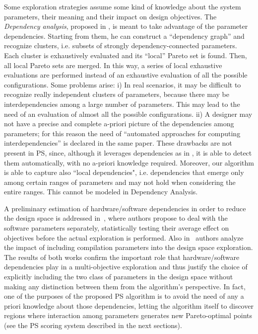 Some exploration strategies assume some kind of knowledge about the
system parameters, their meaning and their impact on design
objectives.  The \emph{Dependency analysis}, proposed in
\cite{givargis_tvlsi02}, is meant to take advantage of the parameter
dependencies. Starting from them, he can construct a ``dependency graph''
and recognize clusters, i.e. subsets of strongly dependency-connected
parameters. Each cluster is exhaustively evaluated and its ``local''
Pareto set is found. Then, all local Pareto sets are merged. In this
way, a series of local exhaustive evaluations are performed instead of
an exhaustive evaluation of all the possible configurations. Some
problems arise: i) In real scenarios, it may be difficult to recognize
really independent clusters of parameters, because there may be
interdependencies among a large number of parameters. This may lead to
the need of an evaluation of almost all the possible configurations.
ii) A designer may not have a precise and complete a-priori picture of
the dependencies among parameters; for this reason the need of
``automated approaches for computing interdependencies'' is declared
in the same paper.  These drawbacks are not present in PS,
since, although it leverages dependencies as in
\cite{givargis_tvlsi02}, it is able to detect them automatically, with
no a-priori knowledge required. Moreover, our algorithm is able to
capture also ``local dependencies", i.e. dependencies that emerge only
among certain ranges of parameters and may not hold when considering
the entire ranges. This cannot be modeled in Dependency Analysis. 

A preliminary estimation of hardware/software dependencies in order to
reduce the design space is addressed in~\cite{Catania2008}, where
authors propose to deal with the software parameters separately,
statistically testing their average effect on objectives before the
actual exploration is performed. Also in~\cite{merging} authors
analyze the impact of including compilation parameters into the design
space exploration. The results of both works confirm the
important role that hardware/software dependencies play in a
multi-objective exploration and thus justify the choice of explicitly
including the two class of parameters in the design space without
making any distinction between them from the algorithm's perspective.
In fact, one of the purposes of the proposed PS algorithm is to avoid
the need of any a priori knowledge about those dependencies, letting
the algorithm itself to discover regions where interaction among
parameters generates new Pareto-optimal points (see the PS scoring
system described in the next sections).

